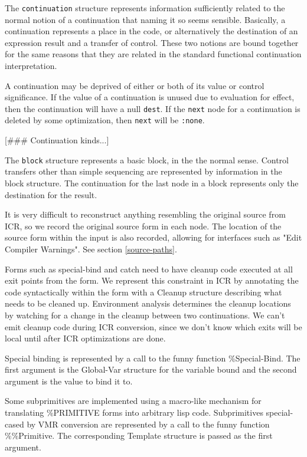 The {\tt continuation} structure represents information sufficiently related
to the normal notion of a continuation that naming it so seems sensible.
Basically, a continuation represents a place in the code, or alternatively the
destination of an expression result and a transfer of control.  These two
notions are bound together for the same reasons that they are related in the
standard functional continuation interpretation.

A continuation may be deprived of either or both of its value or control
significance.  If the value of a continuation is unused due to evaluation for
effect, then the continuation will have a null {\tt dest}.  If the {\tt next}
node for a continuation is deleted by some optimization, then {\tt next} will
be {\tt :none}.

  [\#\#\# Continuation kinds...]

The {\tt block} structure represents a basic block, in the the normal sense.
Control transfers other than simple sequencing are represented by information
in the block structure.  The continuation for the last node in a block
represents only the destination for the result.

It is very difficult to reconstruct anything resembling the original source
from ICR, so we record the original source form in each node.  The location of
the source form within the input is also recorded, allowing for interfaces such
as "Edit Compiler Warnings".  See section \ref{source-paths}.

Forms such as special-bind and catch need to have cleanup code executed at all
exit points from the form.  We represent this constraint in ICR by annotating
the code syntactically within the form with a Cleanup structure describing what
needs to be cleaned up.  Environment analysis determines the cleanup locations
by watching for a change in the cleanup between two continuations.  We can't
emit cleanup code during ICR conversion, since we don't know which exits will
be local until after ICR optimizations are done.

Special binding is represented by a call to the funny function \%Special-Bind.
The first argument is the Global-Var structure for the variable bound and the
second argument is the value to bind it to.

Some subprimitives are implemented using a macro-like mechanism for translating
\%PRIMITIVE forms into arbitrary lisp code.  Subprimitives special-cased by VMR
conversion are represented by a call to the funny function \%\%Primitive.  The
corresponding Template structure is passed as the first argument.

